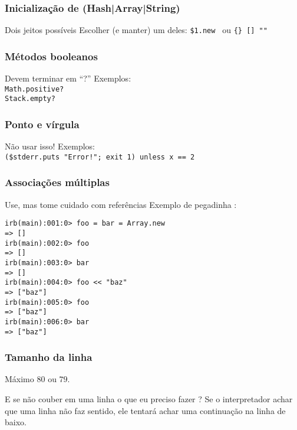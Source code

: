 \documentclass{beamer}
\begin{document}
\begin{frame}[fragile]
    \frametitle{Inicialização de (Hash|Array|String)}
    \begin{block}{Dois jeitos possíveis}
        Escolher (e manter) um deles: \verb#$1.new # ou \verb#{} [] ""#
    \end{block}
\end{frame}

\begin{frame}[fragile]
    \frametitle{Métodos booleanos}
    \begin{block}{Devem terminar em ``?''}
        Exemplos:\\
        \verb#Math.positive? #\\
        \verb#Stack.empty?   #\\
    \end{block}
\end{frame}

\begin{frame}[fragile]
    \frametitle{Ponto e vírgula}
    \begin{block}{Não usar isso!}
        Exemplos:\\
        \verb#($stderr.puts "Error!"; exit 1) unless x == 2#
    \end{block}
\end{frame}

\begin{frame}[fragile]
    \frametitle{Associações múltiplas}
    \begin{block}{Use, mas tome cuidado com referências}
        Exemplo de pegadinha :\\
        \begin{verbatim}
irb(main):001:0> foo = bar = Array.new
=> []
irb(main):002:0> foo
=> []
irb(main):003:0> bar
=> []
irb(main):004:0> foo << "baz"
=> ["baz"]
irb(main):005:0> foo
=> ["baz"]
irb(main):006:0> bar
=> ["baz"]
        \end{verbatim}
    \end{block}
\end{frame}


\begin{frame}[fragile]
    \frametitle{Tamanho da linha}
    \begin{block}{Máximo}
        $80$ ou $79$.
    \end{block}
    \begin{block}{E se não couber em uma linha o que eu preciso fazer ?}
        Se o interpretador achar que uma linha não faz sentido, ele tentará achar uma continuação na linha de baixo.
    \end{block}
\end{frame}
\end{document}
